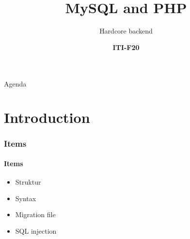 \documentclass[aspectratio=169,10pt,t]{beamer}
\title{MySQL and PHP}
\subtitle{Hardcore backend}
\date{ }
\author{
  \textbf{ITI-F20}
}
\institute[
  SDU Robotics\\
  The Maersk Mc-Kinney Moller Institute\\
  University of Southern Denmark
] %
{%
  SDU Robotics\\
  The Maersk Mc-Kinney Moller Institute\\
  University of Southern Denmark

}
\begin{document}
{\SDUwavesbg%
\begin{frame} %
  \titlepage
\end{frame}}

\begin{frame}{Agenda}{\vphantom{(y}}
\tableofcontents
\end{frame}

\section{Introduction}

\begin{frame}[t]
	\frametitle{Items}
	\framesubtitle{Items}
	\begin{itemize}
		\item Struktur
		\item Syntax
		\item Migration file
		\item SQL injection
	\end{itemize}
\end{frame}
\end{document}
